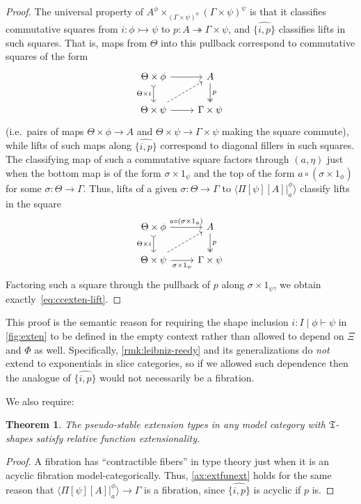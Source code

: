 \documentclass[12pt]{amsart}
\theoremstyle{plain}
\newtheorem{thm}{Theorem}[section]
\theoremstyle{definition}
\theoremstyle{remark}
\numberwithin{equation}{section}
\newcommand{\ccexten}[4]{\langle\Pi[#1][#2] |^{#3}_{#4}\rangle}
\newcommand{\types}{\vdash}
\newcommand{\fT}{\mathfrak{T}}
\begin{document}
\begin{proof}
The universal property of ${A^\phi \times_{(\Gamma \times \psi)^{\phi}} (\Gamma \times \psi)^\psi}$ is that it classifies commutative squares from $i \colon \phi \rightarrowtail\psi$ to $p \colon A \twoheadrightarrow \Gamma \times \psi$, and $\widehat{\{i,p\}}$ classifies lifts in such squares.
That is, maps from $\Theta$ into this pullback correspond to commutative squares of the form
\[
\begin{tikzcd}
  {\Theta \times \phi} \arrow[d, tail, "{\Theta \times i}"'] \arrow[r] & A \arrow[d, two heads, "p"] \\ {\Theta \times \psi} \arrow[r] \ar[ur,dashed] & {\Gamma \times \psi}
\end{tikzcd}
\]
(i.e.\ pairs of maps $\Theta\times\phi\to A$ and $\Theta\times\psi\to\Gamma\times\psi$ making the square commute), while lifts of such maps along $\widehat{\{i,p\}}$ correspond to diagonal fillers in such squares.
The classifying map of such a commutative square factors through $(a, \eta)$ just when the bottom map is of the form $\sigma\times 1_\psi$ and the top of the form $a\circ (\sigma\times 1_\phi)$ for some $\sigma:\Theta\to\Gamma$.
Thus, lifts of a given $\sigma:\Theta\to\Gamma$ to $\ccexten{\psi}{A}{\phi}{a}$ classify lifts in the square
\[
\begin{tikzcd} {\Theta \times \phi} \arrow[d, tail, "{\Theta \times i}"'] \arrow[r, "a\circ (\sigma\times 1_\phi)"] & A \arrow[d, two heads, "p"] \\ {\Theta \times \psi} \arrow[r, "\sigma\times 1_\psi"'] \arrow[ur, dashed] & {\Gamma \times \psi}
\end{tikzcd}
\]
Factoring such a square through the pullback of $p$ along $\sigma\times 1_\psi$, we obtain exactly~\eqref{eq:ccexten-lift}.
\end{proof}

This proof is the semantic reason for requiring the shape inclusion $i:I \mid \phi\types\psi$ in \cref{fig:exten} to be defined in the empty context rather than allowed to depend on $\Xi$ and $\Phi$ as well.
Specifically, \cref{rmk:leibniz-reedy} and its generalizations do \emph{not} extend to exponentials in slice categories, so if we allowed such dependence then the analogue of $\widehat{\{i,p\}}$ would not necessarily be a fibration.

We also require:

\begin{thm}
  The pseudo-stable extension types in any model category with $\fT$-shapes satisfy relative function extensionality.
\end{thm}
\begin{proof}
  A fibration has ``contractible fibers'' in type theory just when it is an acyclic fibration model-categorically.
  Thus, \cref{ax:extfunext} holds for the same reason that $\ccexten{\psi}{A}{\phi}{a}\to\Gamma$ is a fibration, since $\widehat{\{i,p\}}$ is acyclic if $p$ is.
\end{proof}
\end{document}
